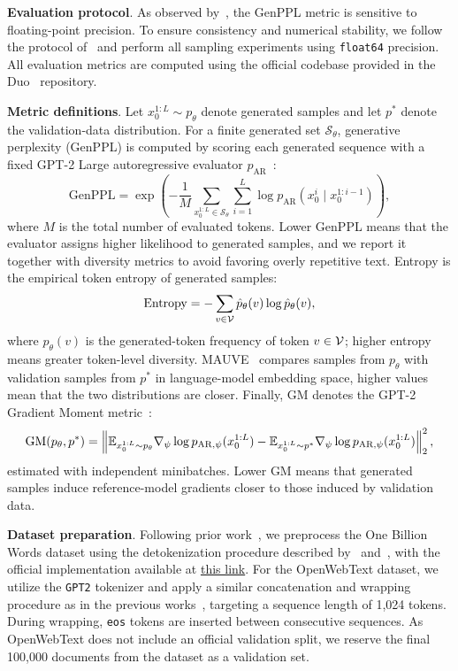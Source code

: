 \noindent \textbf{Evaluation protocol}. 
As observed by~\citep{zheng2024masked}, the GenPPL metric is sensitive to floating-point precision. To ensure consistency and numerical stability, we follow the protocol of~\citep{sahoo2025the} and perform all sampling experiments using \texttt{float64} precision. All evaluation metrics are computed using the official codebase provided in the Duo~\citep{sahoo2025the} repository.

\label{app:metric-definitions}
\noindent \textbf{Metric definitions}.
Let \(x_0^{1:L}\sim p_\theta\) denote generated samples and let \(p^*\) denote the validation-data distribution. For a finite generated set \(\mathcal{S}_\theta\), generative perplexity (GenPPL) is computed by scoring each generated sequence with a fixed GPT-2 Large autoregressive evaluator \(p_{\mathrm{AR}}\)~\citep{radford2019language}:
\[
\mathrm{GenPPL}
=
\exp\!\left(
-\frac{1}{M}
\sum_{x_0^{1:L}\in\mathcal{S}_\theta}
\sum_{i=1}^{L}
\log p_{\mathrm{AR}}(x_0^i\mid x_0^{1:i-1})
\right),
\]
where \(M\) is the total number of evaluated tokens. Lower GenPPL means that the evaluator assigns higher likelihood to generated samples, and we report it together with diversity metrics to avoid favoring overly repetitive text. Entropy is the empirical token entropy of generated samples:
\[
\mathrm{Entropy}
=
-\sum_{v\in\mathcal{V}}\hat{p}_\theta(v)\log \hat{p}_\theta(v),
\]
where \(\hat{p}_\theta(v)\) is the generated-token frequency of token \(v\in\mathcal{V}\); higher entropy means greater token-level diversity. MAUVE~\citep{lou2024discrete} compares samples from \(p_\theta\) with validation samples from \(p^*\) in language-model embedding space, higher values mean that the two distributions are closer. Finally, GM denotes the GPT-2 Gradient Moment metric~\citep{hoogeboom2026beyond}:
\[
\mathrm{GM}(p_\theta,p^*)
=
\left\|
\mathbb{E}_{x_0^{1:L}\sim p_\theta}\nabla_{\psi}\log p_{\mathrm{AR},\psi}(x_0^{1:L})
-
\mathbb{E}_{x_0^{1:L}\sim p^*}\nabla_{\psi}\log p_{\mathrm{AR},\psi}(x_0^{1:L})
\right\|_2^2,
\]
estimated with independent minibatches. Lower GM means that generated samples induce reference-model gradients closer to those induced by validation data.

\noindent \textbf{Dataset preparation}.
Following prior work~\citep{sahoo2024simple, sahoo2025the, lou2024discrete}, we preprocess the One Billion Words dataset using the detokenization procedure described by~\citet{lou2024discrete} and~\citet{sahoo2024simple}, with the official implementation available at \href{https://github.com/louaaron/Score-Entropy-Discrete-Diffusion/blob/main/data.py}{this link}. For the OpenWebText dataset, we utilize the \texttt{GPT2} tokenizer and apply a similar concatenation and wrapping procedure as in the previous works~\citep{sahoo2024simple, sahoo2025the}, targeting a sequence length of 1,024 tokens. During wrapping, \texttt{eos} tokens are inserted between consecutive sequences. As OpenWebText does not include an official validation split, we reserve the final 100{,}000 documents from the dataset as a validation set.

